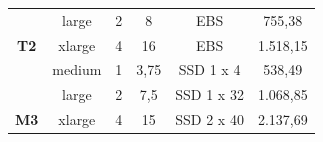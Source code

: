 \begin{table}
\begin{tabular}{cccccc}
\multicolumn{1}{|c|}{\cellcolor[HTML]{EFEFEF}}                              & \multicolumn{1}{c|}{large}                                   & \multicolumn{1}{c|}{2}                                    & \multicolumn{1}{c|}{8}                                                                                      & \multicolumn{1}{c|}{EBS}                                                                                          & \multicolumn{1}{c|}{755,38}                                                                             \\ \cline{2-6} 
\multicolumn{1}{|c|}{\multirow{-5}{*}{\cellcolor[HTML]{EFEFEF}\textbf{T2}}} & \multicolumn{1}{c|}{xlarge}                                  & \multicolumn{1}{c|}{4}                                    & \multicolumn{1}{c|}{16}                                                                                     & \multicolumn{1}{c|}{EBS}                                                                                          & \multicolumn{1}{c|}{1.518,15}                                                                           \\ \hline
\multicolumn{1}{|c|}{\cellcolor[HTML]{EFEFEF}}                              & \multicolumn{1}{c|}{medium}                                  & \multicolumn{1}{c|}{1}                                    & \multicolumn{1}{c|}{3,75}                                                                                   & \multicolumn{1}{c|}{SSD 1 x 4}                                                                                        & \multicolumn{1}{c|}{538,49}                                                                             \\ \cline{2-6} 
\multicolumn{1}{|c|}{\cellcolor[HTML]{EFEFEF}}                              & \multicolumn{1}{c|}{large}                                   & \multicolumn{1}{c|}{2}                                    & \multicolumn{1}{c|}{7,5}                                                                                    & \multicolumn{1}{c|}{SSD 1 x 32}                                                                                       & \multicolumn{1}{c|}{1.068,85}                                                                           \\ \cline{2-6} 
\multicolumn{1}{|c|}{\multirow{-3}{*}{\cellcolor[HTML]{EFEFEF}\textbf{M3}}} & \multicolumn{1}{c|}{xlarge}                                  & \multicolumn{1}{c|}{4}                                    & \multicolumn{1}{c|}{15}                                                                                     & \multicolumn{1}{c|}{SSD 2 x 40}                                                                                       & \multicolumn{1}{c|}{2.137,69}                                                                           \\ \hline

\end{tabular}
\end{table}
